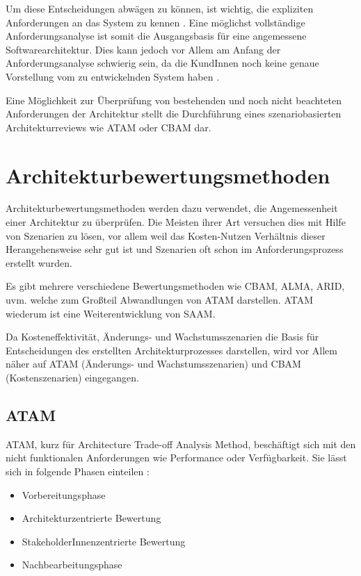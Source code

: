 Um diese Entscheidungen abwägen zu können, ist wichtig, die expliziten Anforderungen an das System zu kennen \cite[S. 19]{review}. Eine möglichst vollständige Anforderungsanalyse ist somit die Ausgangsbasis für eine angemessene Softwarearchitektur. Dies kann jedoch vor Allem am Anfang der Anforderungsanalyse schwierig sein, da die KundInnen noch keine genaue Vorstellung vom zu entwickelnden System haben \cite[S. 80]{reqman}.

Eine Möglichkeit zur Überprüfung von bestehenden und noch nicht beachteten Anforderungen der Architektur stellt die Durchführung eines szenariobasierten Architekturreviews wie ATAM oder CBAM dar.


\section{Architekturbewertungsmethoden}
Architekturbewertungsmethoden werden dazu verwendet, die Angemessenheit einer Architektur zu überprüfen. Die Meisten ihrer Art versuchen dies mit Hilfe von Szenarien zu lösen, vor allem weil das Kosten-Nutzen Verhältnis dieser Herangehensweise sehr gut ist \cite[S. 185]{basiswissen} und Szenarien oft schon im Anforderungsprozess erstellt wurden\cite[S. 62]{effektiv}.

Es gibt mehrere verschiedene Bewertungsmethoden wie CBAM, ALMA, ARID, uvm. welche zum Großteil Abwandlungen von ATAM darstellen. ATAM wiederum ist eine Weiterentwicklung von SAAM. \cite[S. 60-76]{review}

Da Kosteneffektivität, Änderungs- und Wachstumsszenarien die Basis für Entscheidungen des erstellten Architekturprozesses darstellen, wird vor Allem näher auf ATAM (Änderungs- und Wachstumsszenarien) und CBAM (Kostenszenarien) eingegangen.

\subsection{ATAM}
ATAM, kurz für Architecture Trade-off Analysis Method, beschäftigt sich mit den nicht funktionalen Anforderungen wie Performance oder Verfügbarkeit. Sie lässt sich in folgende Phasen einteilen \cite[S. 185]{basiswissen}:

\begin{itemize}
  \item Vorbereitungsphase
  \item Architekturzentrierte Bewertung
  \item StakeholderInnenzentrierte Bewertung
  \item Nachbearbeitungsphase
\end{itemize}

